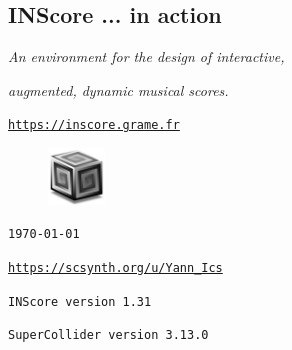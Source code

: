 \documentclass{article}
\newcommand{\icon}[1]{\texttt{[image: \#1]}}
\begin{document}
\begin{center}
\section*{\huge\sffamily INScore ... in action}
\vspace{-0.3cm}
\textsl{An environment for the design of interactive,}

\textsl{augmented, dynamic musical scores.}

\href{https://inscore.grame.fr}{\texttt{\small https://inscore.grame.fr}}

\vspace{0.3cm} 

\begin{figure}[htbp]
\begin{center}
\includegraphics[width=1.5cm]{sc}
\end{center}
\end{figure}
\texttt{\today}

\href{https://scsynth.org/u/Yann\_Ics}{\texttt{\small https://scsynth.org/u/Yann\_Ics}}

\end{center}
\vspace{0.2cm}


\begin{center}
\texttt{\footnotesize INScore version 1.31}
 
 \vspace{-0.1cm}
\texttt{\footnotesize SuperCollider version 3.13.0}
\end{center}

\vspace{0.7cm}
\end{document}

